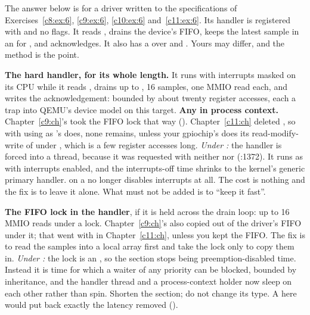 
The answer below is for a driver written to the specifications of Exercises~\ref{c8:ex:6},
\ref{c9:ex:6}, \ref{c10:ex:6} and~\ref{c11:ex:6}. Its handler is registered with
 and no flags. It reads , drains the device's FIFO, keeps
the latest sample in an  for , and acknowledges. It also has a
 over  and . Yours may differ, and the method is the
point.

 \textbf{The hard handler, for its whole length.} It runs with interrupts masked on its
CPU while it reads , drains up to , 16 samples, one MMIO
read each, and writes the acknowledgement: bounded by about twenty register accesses, each a trap
into QEMU's device model on this target. \textbf{Any  in process context.}
Chapter~\ref{c9:ch}'s  took the FIFO lock that way ().
Chapter~\ref{c11:ch} deleted , so with  using  as 's does,
none remains, unless your gpiochip's  does its read-modify-write of  under
, which is a few register accesses long.
\emph{Under :} the handler is forced into a thread, because it was requested with
neither  nor  (:1372). It runs
as  with interrupts enabled, and the interrupts-off time shrinks to the kernel's
generic primary handler.  on a  no longer disables
interrupts at all. The cost is nothing and the fix is to leave it alone. What must not be added is
 to ``keep it fast''.

 \textbf{The FIFO lock in the handler}, if it is held across the drain loop: up to 16 MMIO
reads under a lock. Chapter~\ref{c9:ch}'s  also copied out of the driver's FIFO under
it; that went with  in Chapter~\ref{c11:ch}, unless you kept the FIFO. The fix is to read
the samples into a local array first and take the lock only to copy them in.
\emph{Under :} the lock is an , so the section stops being
preemption-disabled time. Instead it is time for which a waiter of any priority can be blocked,
bounded by inheritance, and the handler thread and a process-context holder now sleep on each other
rather than spin. Shorten the section; do not change its type. A  here would
put back exactly the latency  removed ().

